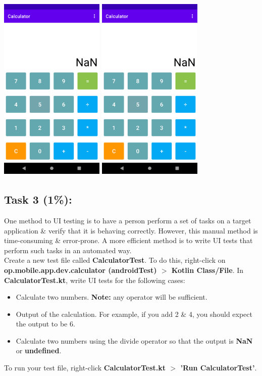 \documentclass{article}
\begin{document}
\includegraphics[width=5cm, height=9cm]{../tex/img/03-events/practical/calculator-3.png}
\includegraphics[width=5cm, height=9cm]{../tex/img/03-events/practical/calculator-4.png}

\subsection*{Task 3 (1\%):} 
One method to UI testing is to have a person perform a set of tasks on a target application \& verify that it is behaving correctly. However, this manual method is time-consuming \& error-prone. A more efficient method is to write UI tests that perform such tasks in an automated way. \\

Create a new test file called \textbf{CalculatorTest}. To do this, right-click on \textbf{op.mobile.app.dev.calculator (androidTest) $>$ Kotlin Class/File}. In \textbf{CalculatorTest.kt}, write UI tests for the following cases:

\begin{itemize}
	\item Calculate two numbers. \textbf{Note:} any operator will be sufficient.
	\item Output of the calculation. For example, if you add 2 \& 4, you should expect the output to be 6.
	\item Calculate two numbers using the divide operator so that the output is \textbf{NaN} or \textbf{undefined}.
\end{itemize}

To run your test file, right-click \textbf{CalculatorTest.kt $>$ 'Run CalculatorTest'}.
\end{document}
